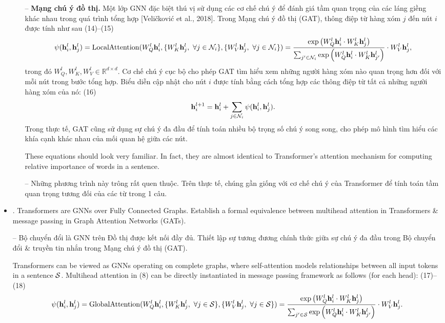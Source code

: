 \documentclass{article}
\begin{document}
\begin{itemize}
\begin{itemize}
        -- {\bf Mạng chú ý đồ thị.} Một lớp GNN đặc biệt thú vị sử dụng các cơ chế chú ý để đánh giá tầm quan trọng của các láng giềng khác nhau trong quá trình tổng hợp [Veličković et al., 2018]. Trong Mạng chú ý đồ thị (GAT), thông điệp từ hàng xóm $j$ đến nút $i$ được tính như sau (14)--(15)
        \begin{equation*}
            \psi({\bf h}_i^l,{\bf h}_j^l) = {\rm LocalAttention}(W_Q^l{\bf h}_i^l,\{W_K^l{\bf h}_j^l,\ \forall j\in{\cal N}_i\},\{W_V^l{\bf h}_j^l,\ \forall j\in{\cal N}_i\}) = \frac{\exp\left(W_Q^l{\bf h}_i^l\cdot W_K^l{\bf h}_j^l\right)}{\sum_{j'\in{\cal N}_i} \exp\left(W_Q^l{\bf h}_i^l\cdot W_K^l{\bf h}_{j'}^l\right)}\cdot W_V^l{\bf h}_j^l,
        \end{equation*}
        trong đó $W_Q^l,W_K^l,W_V^l\in\mathbb{R}^{d\times d}$. Cơ chế chú ý cục bộ cho phép GAT tìm hiểu xem những người hàng xóm nào quan trọng hơn đối với mỗi nút trong bước tổng hợp. Biểu diễn cập nhật cho nút $i$ được tính bằng cách tổng hợp các thông điệp từ tất cả những người hàng xóm của nó: (16)
        \begin{equation*}
            {\bf h}_i^{l + 1} = {\bf h}_i^l + \sum_{j\in{\cal N}_i} \psi({\bf h}_i^l,{\bf h}_j^l).
        \end{equation*}
        Trong thực tế, GAT cũng sử dụng sự chú ý đa đầu để tính toán nhiều bộ trọng số chú ý song song, cho phép mô hình tìm hiểu các khía cạnh khác nhau của mối quan hệ giữa các nút.

        These equations should look very familiar. In fact, they are almost identical to Transformer's attention mechanism for computing relative importance of words in a sentence.

        -- Những phương trình này trông rất quen thuộc. Trên thực tế, chúng gần giống với cơ chế chú ý của Transformer để tính toán tầm quan trọng tương đối của các từ trong 1 câu.
    \end{itemize}
    \item {. Transformers are GNNs over Fully Connected Graphs.} Establish a formal equivalence between multihead attention in Transformers \& message passing in Graph Attention Networks (GATs).

    -- {\sf Bộ chuyển đổi là GNN trên Đồ thị được kết nối đầy đủ.} Thiết lập sự tương đương chính thức giữa sự chú ý đa đầu trong Bộ chuyển đổi \& truyền tin nhắn trong Mạng chú ý đồ thị (GAT).

    Transformers can be viewed as GNNs operating on complete graphs, where self-attention models relationships between all input tokens in a sentence ${\cal S}$. Multihead attention in (8) can be directly instantiated in message passing framework as follows (for each head): (17)--(18)
    \begin{equation*}
        \psi({\bf h}_i^l,{\bf h}_j^l) = {\rm GlobalAttention}(W_Q^l{\bf h}_i^l,\{W_K^l{\bf h}_j^l,\ \forall j\in{\cal S}\},\{W_V^l{\bf h}_j^l,\ \forall j\in{\cal S}\}) = \frac{\exp\left(W_Q^l{\bf h}_i^l\cdot W_K^l{\bf h}_j^l\right)}{\sum_{j'\in{\cal S}} \exp\left(W_Q^l{\bf h}_i^l\cdot W_K^l{\bf h}_{j'}^l\right)}\cdot W_V^l{\bf h}_j^l.
    \end{equation*}



\end{itemize}
\end{document}
